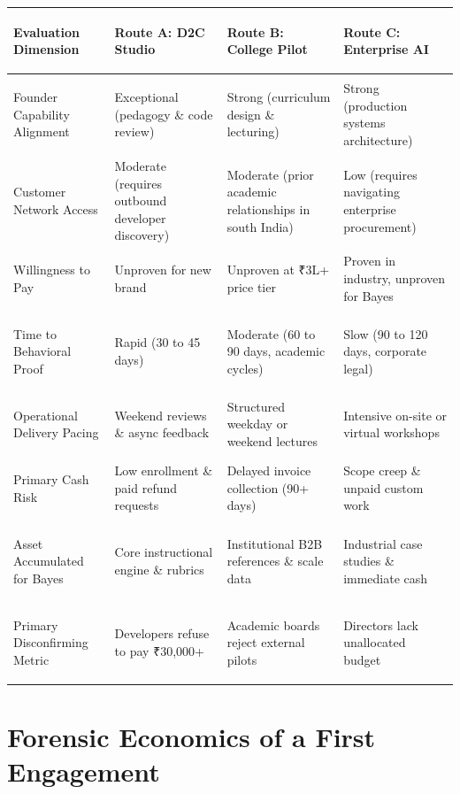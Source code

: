 \begin{tcolorbox}[
  enhanced,
  colback=BayesSurface!60,
  colframe=BayesBorder,
  boxrule=0.5pt,
  arc=3pt,
  left=3pt,right=3pt,top=3pt,bottom=3pt,
  boxsep=1pt
]
\scriptsize
\begin{tabularx}{\linewidth}{>{\bfseries\raggedright\arraybackslash}p{2.0cm} >{\raggedright\arraybackslash}p{1.7cm} >{\raggedright\arraybackslash}p{1.8cm} X}
\toprule
\textbf{Evaluation Dimension} & \textbf{Route A: D2C Studio} & \textbf{Route B: College Pilot} & \textbf{Route C: Enterprise AI} \\
\midrule
Founder Capability Alignment & Exceptional (pedagogy \& code review) & Strong (curriculum design \& lecturing) & Strong (production systems architecture) \\
\addlinespace[2pt]
Customer Network Access & Moderate (requires outbound developer discovery) & Moderate (prior academic relationships in south India) & Low (requires navigating enterprise procurement) \\
\addlinespace[2pt]
Willingness to Pay & Unproven for new brand & Unproven at ₹3L+ price tier & Proven in industry, unproven for Bayes \\
\addlinespace[2pt]
Time to Behavioral Proof & Rapid (30 to 45 days) & Moderate (60 to 90 days, academic cycles) & Slow (90 to 120 days, corporate legal) \\
\addlinespace[2pt]
Operational Delivery Pacing & Weekend reviews \& async feedback & Structured weekday or weekend lectures & Intensive on-site or virtual workshops \\
\addlinespace[2pt]
Primary Cash Risk & Low enrollment \& paid refund requests & Delayed invoice collection (90+ days) & Scope creep \& unpaid custom work \\
\addlinespace[2pt]
Asset Accumulated for Bayes & Core instructional engine \& rubrics & Institutional B2B references \& scale data & Industrial case studies \& immediate cash \\
\addlinespace[2pt]
Primary Disconfirming Metric & Developers refuse to pay ₹30,000+ & Academic boards reject external pilots & Directors lack unallocated budget \\
\bottomrule
\end{tabularx}
\end{tcolorbox}

\section{Forensic Economics of a First Engagement}

